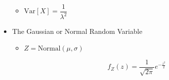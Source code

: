\begin{itemize}
\begin{itemize}
      \item $\text{Var}[X]=\dfrac{1}{\lambda^2}$

    \end{itemize}

  \item The Gaussian or Normal Random Variable

    \begin{itemize}

      \item $Z=\text{Normal}(\mu,\sigma)$

        $$f_Z(z)=\frac{1}{\sqrt{2\pi}}e^{-\frac{z^2}{2}}$$

    \end{itemize}

\end{itemize}



